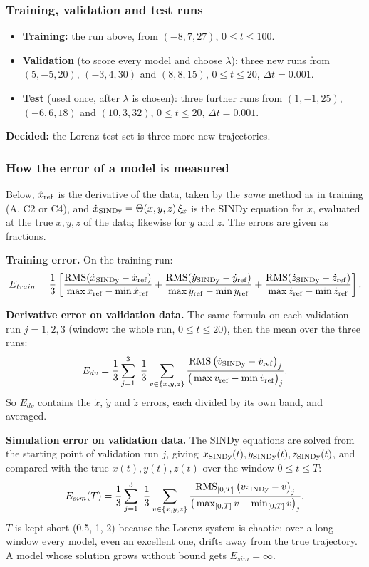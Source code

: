 \documentclass[11pt,a4paper]{article}
\newcommand{\decided}[1]{\textcolor{green!40!black}{\textbf{Decided:} #1}}
\newcommand{\RMS}{\operatorname{RMS}}
\begin{document}
\subsubsection{Training, validation and test runs}
\begin{itemize}
  \item \textbf{Training:} the run above, from $(-8,7,27)$, $0\le t\le100$.
  \item \textbf{Validation} (to score every model and choose $\lambda$): three new runs from $(5,-5,20)$, $(-3,4,30)$ and $(8,8,15)$, $0\le t\le 20$, $\Delta t=0.001$.
  \item \textbf{Test} (used once, after $\lambda$ is chosen): three further runs from $(1,-1,25)$, $(-6,6,18)$ and $(10,3,32)$, $0\le t\le 20$, $\Delta t=0.001$.
\end{itemize}
\decided{the Lorenz test set is three more new trajectories.}

\subsubsection{How the error of a model is measured}\label{sec:lorenz-err}
Below, $\dot x_{\rm ref}$ is the derivative of the data, taken by the \emph{same} method as in training (A, C2 or C4), and $\dot x_{\rm SINDy}=\Theta(x,y,z)\,\xi_x$ is the SINDy equation for $\dot x$, evaluated at the true $x,y,z$ of the data; likewise for $y$ and $z$. The errors are given as fractions.

\textbf{Training error.} On the training run:
\[
  E_{train} = \frac13\left[
  \frac{\RMS(\dot x_{\rm SINDy}-\dot x_{\rm ref})}{\max\dot x_{\rm ref}-\min\dot x_{\rm ref}} +
  \frac{\RMS(\dot y_{\rm SINDy}-\dot y_{\rm ref})}{\max\dot y_{\rm ref}-\min\dot y_{\rm ref}} +
  \frac{\RMS(\dot z_{\rm SINDy}-\dot z_{\rm ref})}{\max\dot z_{\rm ref}-\min\dot z_{\rm ref}}\right].
\]

\textbf{Derivative error on validation data.} The same formula on each validation run $j=1,2,3$ (window: the whole run, $0\le t\le20$), then the mean over the three runs:
\[
  E_{dv} = \frac13\sum_{j=1}^{3}\ \frac13\sum_{v\in\{x,y,z\}}
  \frac{\RMS\big(\dot v_{\rm SINDy}-\dot v_{\rm ref}\big)_j}{\big(\max \dot v_{\rm ref}-\min\dot v_{\rm ref}\big)_j}.
\]
So $E_{dv}$ contains the $\dot x$, $\dot y$ and $\dot z$ errors, each divided by its own band, and averaged.

\textbf{Simulation error on validation data.} The SINDy equations are solved from the starting point of validation run $j$, giving $x_{\rm SINDy}(t), y_{\rm SINDy}(t), z_{\rm SINDy}(t)$, and compared with the true $x(t),y(t),z(t)$ over the window $0\le t\le T$:
\[
  E_{sim}(T) = \frac13\sum_{j=1}^{3}\ \frac13\sum_{v\in\{x,y,z\}}
  \frac{\RMS_{[0,T]}\big(v_{\rm SINDy}-v\big)_j}{\big(\max_{[0,T]} v-\min_{[0,T]} v\big)_j}.
\]
$T$ is kept short (0.5, 1, 2) because the Lorenz system is chaotic: over a long window every model, even an excellent one, drifts away from the true trajectory. A model whose solution grows without bound gets $E_{sim}=\infty$.
\end{document}
